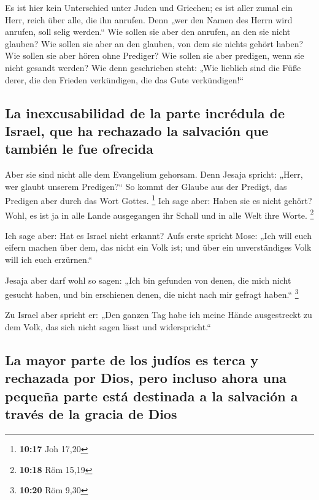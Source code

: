  Es ist hier kein Unterschied unter Juden und Griechen;
es ist aller zumal ein Herr, reich über alle, die ihn anrufen.
 Denn „wer den Namen des Herrn wird anrufen, soll selig
werden.``  Wie sollen sie aber den anrufen, an den sie
nicht glauben? Wie sollen sie aber an den glauben, von dem sie nichts
gehört haben? Wie sollen sie aber hören ohne Prediger? 
Wie sollen sie aber predigen, wenn sie nicht gesandt werden? Wie denn
geschrieben steht: „Wie lieblich sind die Füße derer, die den Frieden
verkündigen, die das Gute verkündigen!{}``

\hypertarget{la-inexcusabilidad-de-la-parte-incruxe9dula-de-israel-que-ha-rechazado-la-salvaciuxf3n-que-tambiuxe9n-le-fue-ofrecida}{%
\subsection{La inexcusabilidad de la parte incrédula de Israel, que ha
rechazado la salvación que también le fue
ofrecida}\label{la-inexcusabilidad-de-la-parte-incruxe9dula-de-israel-que-ha-rechazado-la-salvaciuxf3n-que-tambiuxe9n-le-fue-ofrecida}}

 Aber sie sind nicht alle dem Evangelium gehorsam. Denn
Jesaja spricht: „Herr, wer glaubt unserem Predigen?{}`` 
So kommt der Glaube aus der Predigt, das Predigen aber durch das Wort
Gottes. \footnote{\textbf{10:17} Joh 17,20}  Ich sage
aber: Haben sie es nicht gehört? Wohl, es ist ja in alle Lande
ausgegangen ihr Schall und in alle Welt ihre Worte. \footnote{\textbf{10:18}
  Röm 15,19}

 Ich sage aber: Hat es Israel nicht erkannt? Aufs erste
spricht Mose: „Ich will euch eifern machen über dem, das nicht ein Volk
ist; und über ein unverständiges Volk will ich euch erzürnen.``

 Jesaja aber darf wohl so sagen: „Ich bin gefunden von
denen, die mich nicht gesucht haben, und bin erschienen denen, die nicht
nach mir gefragt haben.`` \footnote{\textbf{10:20} Röm 9,30}

 Zu Israel aber spricht er: „Den ganzen Tag habe ich
meine Hände ausgestreckt zu dem Volk, das sich nicht sagen lässt und
widerspricht.``

\hypertarget{la-mayor-parte-de-los-juduxedos-es-terca-y-rechazada-por-dios-pero-incluso-ahora-una-pequeuxf1a-parte-estuxe1-destinada-a-la-salvaciuxf3n-a-travuxe9s-de-la-gracia-de-dios}{%
\subsection{La mayor parte de los judíos es terca y rechazada por Dios,
pero incluso ahora una pequeña parte está destinada a la salvación a
través de la gracia de
Dios}\label{la-mayor-parte-de-los-juduxedos-es-terca-y-rechazada-por-dios-pero-incluso-ahora-una-pequeuxf1a-parte-estuxe1-destinada-a-la-salvaciuxf3n-a-travuxe9s-de-la-gracia-de-dios}}

